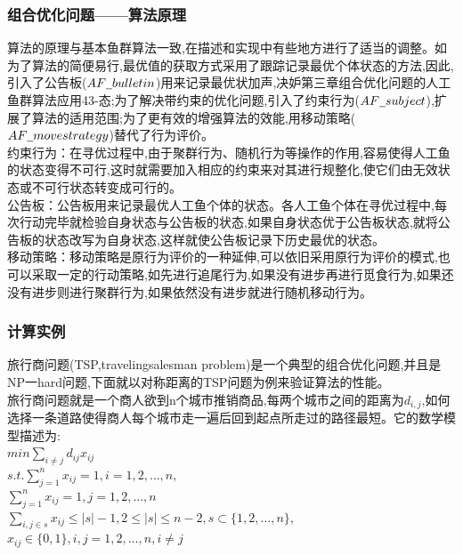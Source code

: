 \begin{frame}
\frametitle{组合优化问题——算法原理}
算法的原理与基本鱼群算法一致,在描述和实现中有些地方进行了适当的调整。如为了算法的简便易行,最优值的获取方式采用了跟踪记录最优个体状态的方法,因此,引入了公告板($AF\underline{\hspace{0.5em}}bulletin$)用来记录最优状加声,决妒第三章组合优化问题的人工鱼群算法应用43-态;为了解决带约束的优化问题,引入了约束行为($AF\underline{\hspace{0.5em}}subject$),扩展了算法的适用范围;为了更有效的增强算法的效能,用移动策略($AF\underline{\hspace{0.5em}}movestrategy$)替代了行为评价。\\
约束行为：在寻优过程中,由于聚群行为、随机行为等操作的作用,容易使得人工鱼的状态变得不可行,这时就需要加入相应的约束来对其进行规整化,使它们由无效状态或不可行状态转变成可行的。\\
\hspace{2em}公告板：公告板用来记录最优人工鱼个体的状态。各人工鱼个体在寻优过程中,每次行动完毕就检验自身状态与公告板的状态,如果自身状态优于公告板状态,就将公告板的状态改写为自身状态,这样就使公告板记录下历史最优的状态。\\
\hspace{2em}移动策略：移动策略是原行为评价的一种延伸,可以依旧采用原行为评价的模式,也可以采取一定的行动策略,如先进行追尾行为,如果没有进步再进行觅食行为,如果还没有进步则进行聚群行为,如果依然没有进步就进行随机移动行为。
\end{frame}

\begin{frame}
\frametitle{计算实例}
旅行商问题(TSP,travelingsalesman problem)是一个典型的组合优化问题,并且是NP一hard问题,下面就以对称距离的TSP问题为例来验证算法的性能。\\
旅行商问题就是一个商人欲到n个城市推销商品,每两个城市之间的距离为$d_{i,j}$,如何选择一条道路使得商人每个城市走一遍后回到起点所走过的路径最短。它的数学模型描述为:\\
$min\sum_{i\ne j}d_{ij}x_{ij}$\\
$s.t.\sum_{j=1}^n x_{ij}=1,i=1,2,…,n,$\\
\indent $\sum_{j=1}^n x_{ij}=1,j=1,2,…,n$\\
\indent $\sum_{i,j \in s} x_{ij}\le |s|-1,2\le|s|\le n-2, s\subset \{ 1,2,…,n\},$\\
\indent $x_{ij}\in \{0,1\},i,j=1,2,…,n,i\ne j$
\end{frame}

